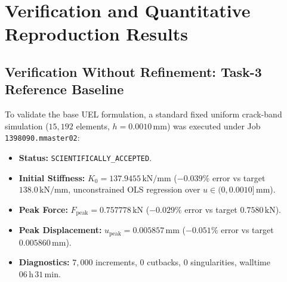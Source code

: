 \documentclass[11pt,a4paper]{report}
\begin{document}
\chapter{Verification and Quantitative Reproduction Results}
\label{chap:results}

\section{Verification Without Refinement: Task-3 Reference Baseline}
\label{sec:task3_baseline}
To validate the base UEL formulation, a standard fixed uniform crack-band simulation ($15{,}192$ elements, $h = 0.0010\,\mathrm{mm}$) was executed under Job \texttt{1398090.mmaster02}:
\begin{itemize}
    \item \textbf{Status:} \texttt{SCIENTIFICALLY\_ACCEPTED}.
    \item \textbf{Initial Stiffness:} $K_0 = 137.9455\,\mathrm{kN/mm}$ ($-0.039\%$ error vs target $138.0\,\mathrm{kN/mm}$, unconstrained OLS regression over $u \in (0, 0.0010]\,\mathrm{mm}$).
    \item \textbf{Peak Force:} $F_{\text{peak}} = 0.757778\,\mathrm{kN}$ ($-0.029\%$ error vs target $0.7580\,\mathrm{kN}$).
    \item \textbf{Peak Displacement:} $u_{\text{peak}} = 0.005857\,\mathrm{mm}$ ($-0.051\%$ error vs target $0.005860\,\mathrm{mm}$).
    \item \textbf{Diagnostics:} $7{,}000$ increments, $0$ cutbacks, $0$ singularities, walltime $06\,\mathrm{h}\,31\,\mathrm{min}$.
\end{itemize}
\end{document}
